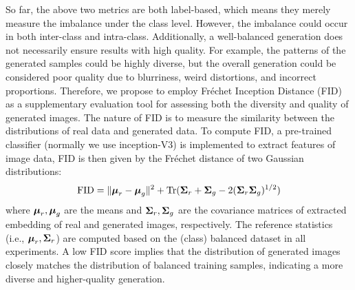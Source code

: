 \begin{description}[leftmargin=0pt]
    \item [FID] So far, the above two metrics are both label-based, which means they merely measure the imbalance under the class level. However, the imbalance could occur in both inter-class and intra-class. Additionally, a well-balanced generation does not necessarily ensure results with high quality. For example, the patterns of the generated samples could be highly diverse, but the overall generation could be considered poor quality due to blurriness, weird distortions, and incorrect proportions. Therefore, we propose to employ Fr\'{e}chet Inception Distance (FID) \cite{heuselGANsTrainedTwo2017} as a supplementary evaluation tool for assessing both the diversity and quality of generated images. The nature of FID is to measure the similarity between the distributions of real data and generated data. To compute FID, a pre-trained classifier (normally we use inception-V3) is implemented to extract features of image data, FID is then given by the Fr\'{e}chet distance of two Gaussian distributions: 
    \begin{equation}
        \text{FID} = \| \boldsymbol{\mu}_r - \boldsymbol{\mu}_g \|^2 + \text{Tr}(\mathbf{\Sigma}_r + \mathbf{\Sigma}_g - 2(\mathbf{\Sigma}_r \mathbf{\Sigma}_g)^{1/2})
    \end{equation}
    where $\boldsymbol{\mu}_r,\boldsymbol{\mu}_g$ are the means and $\mathbf{\Sigma}_r,\mathbf{\Sigma}_g$ are the covariance matrices of extracted embedding of real and generated images, respectively. The reference statistics (i.e., $\boldsymbol{\mu}_r, \mathbf{\Sigma}_r$) are computed based on the (class) balanced dataset in all experiments. A low FID score implies that the distribution of generated images closely matches the distribution of balanced training samples, indicating a more diverse and higher-quality generation.
    
\end{description}



